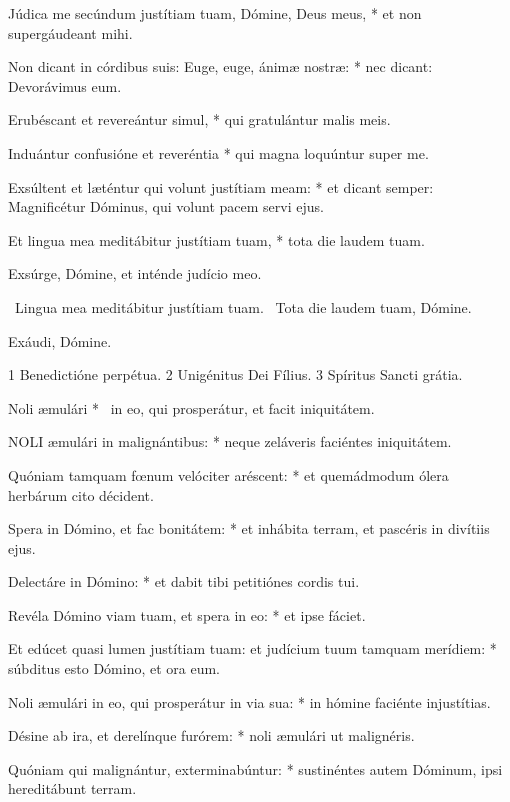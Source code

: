 Júdica me secúndum justítiam tuam, Dómine, Deus meus, * et non supergáudeant mihi.

Non dicant in córdibus suis: Euge, euge, ánimæ nostræ: * nec dicant: Devorávimus eum.

Erubéscant et revereántur simul, * qui gratulántur malis meis.

Induántur confusióne et reveréntia * qui magna loquúntur super me.

Exsúltent et læténtur qui volunt justítiam meam: * et dicant semper: Magnificétur Dóminus, qui volunt pacem servi ejus.

Et lingua mea meditábitur justítiam tuam, * tota die laudem tuam.

 Exsúrge, Dómine, et inténde judício meo.


\V\ Lingua mea meditábitur justítiam tuam. \R\ Tota die laudem tuam, Dómine.

 Exáudi, Dómine.

 1 Benedictióne perpétua. 2 Unigénitus Dei Fílius. 3 Spíritus Sancti grátia.


 Noli æmulári * \textdagger\ in eo, qui prosperátur, et facit iniquitátem.


\lettrine[lines=2]{N}{OLI} æmulári in malignántibus: * neque zeláveris faciéntes iniquitátem.

Quóniam tamquam fœnum velóciter aréscent: * et quemádmodum ólera herbárum cito décident.

Spera in Dómino, et fac bonitátem: * et inhábita terram, et pascéris in divítiis ejus.

Delectáre in Dómino: * et dabit tibi petitiónes cordis tui.

Revéla Dómino viam tuam, et spera in eo: * et ipse fáciet.

Et edúcet quasi lumen justítiam tuam: et judícium tuum tamquam merídiem: * súbditus esto Dómino, et ora eum.

Noli æmulári in eo, qui prosperátur in via sua: * in hómine faciénte injustítias.

Désine ab ira, et derelínque furórem: * noli æmulári ut malignéris.

Quóniam qui malignántur, exterminabúntur: * sustinéntes autem Dóminum, ipsi hereditábunt terram.

